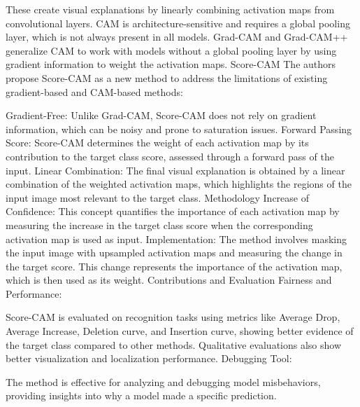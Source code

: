 These create visual explanations by linearly combining activation maps from convolutional layers.
CAM is architecture-sensitive and requires a global pooling layer, which is not always present in all models.
Grad-CAM and Grad-CAM++ generalize CAM to work with models without a global pooling layer by using gradient information to weight the activation maps.
Score-CAM
The authors propose Score-CAM as a new method to address the limitations of existing gradient-based and CAM-based methods:

Gradient-Free: Unlike Grad-CAM, Score-CAM does not rely on gradient information, which can be noisy and prone to saturation issues.
Forward Passing Score: Score-CAM determines the weight of each activation map by its contribution to the target class score, assessed through a forward pass of the input.
Linear Combination: The final visual explanation is obtained by a linear combination of the weighted activation maps, which highlights the regions of the input image most relevant to the target class.
Methodology
Increase of Confidence: This concept quantifies the importance of each activation map by measuring the increase in the target class score when the corresponding activation map is used as input.
Implementation:
The method involves masking the input image with upsampled activation maps and measuring the change in the target score.
This change represents the importance of the activation map, which is then used as its weight.
Contributions and Evaluation
Fairness and Performance:

Score-CAM is evaluated on recognition tasks using metrics like Average Drop, Average Increase, Deletion curve, and Insertion curve, showing better evidence of the target class compared to other methods.
Qualitative evaluations also show better visualization and localization performance.
Debugging Tool:

The method is effective for analyzing and debugging model misbehaviors, providing insights into why a model made a specific prediction.

